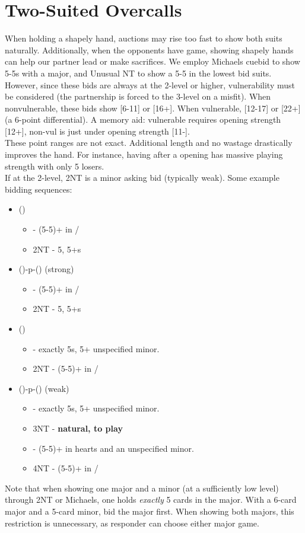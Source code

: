 \documentclass[12pt]{report}
\newcommand{\n}{\\}
\newcommand{\q}[1]{\multido{}{#1}{\qquad}}
\newcommand{\ul}[1]{\begin{itemize}#1\end{itemize}}
\newcommand{\li}[1]{\item[~] \q{#1}}
\begin{document}
\section{Two-Suited Overcalls} \label{4:6}

    When holding a shapely hand, auctions may rise too fast to show both suits naturally.  Additionally, when the opponents have game, showing shapely hands can help our partner lead or make sacrifices.  We employ Michaels cuebid to show 5-5s with a major, and Unusual NT to show a 5-5 in the lowest bid suits. \n

    However, since these bids are always at the 2-level or higher, vulnerability must be considered (the partnership is forced to the 3-level on a misfit).  When nonvulnerable, these bids show [6-11] or [16+].  When vulnerable, [12-17] or [22+] (a 6-point differential).  A memory aid: vulnerable requires opening strength [12+], non-vul is just under opening strength [11-]. \n
    
    These point ranges are not exact.  Additional length and no wastage drastically improves the hand.  For instance, having   \di{}  after a  opening has massive playing strength with only 5 losers.\n
    
    If at the 2-level, 2NT is a minor asking bid (typically weak).  Some example bidding sequences:

    \ul{
        \li0 () \ul{
            \li0  - (5-5)+ in \he{}/\sp{}
            \li0 2NT - 5\he{}, 5+\di{}s
        }

        \li0 (\di1)-p-(\di2) (strong) \ul{
            \li0 \di3 - (5-5)+ in \he{}/\sp{}
            \li0 2NT - 5\he{}, 5+\cl{}s
        }

        \li0 (\he1) \ul{
            \li0 \sp2 - exactly 5\sp{}s, 5+ unspecified minor.
            \li0 2NT - (5-5)+ in \cl{}/\di{}
        }

        \li0 (\sp1)-p-(\sp3) (weak) \ul{
            \li0 \sp2 - exactly 5\he{}s, 5+ unspecified minor.
            \li0 3NT - \textbf{natural, to play}
            \li0 \sp4 - (5-5)+ in hearts and an unspecified minor.
            \li0 4NT - (5-5)+ in \cl{}/\di{}
        }
    }

    Note that when showing one major and a minor (at a sufficiently low level) through 2NT or Michaels, one holds \textit{exactly} 5 cards in the major.  With a 6-card major and a 5-card minor, bid the major first.  When showing both majors, this restriction is unnecessary, as responder can choose either major game. \n
\end{document}

